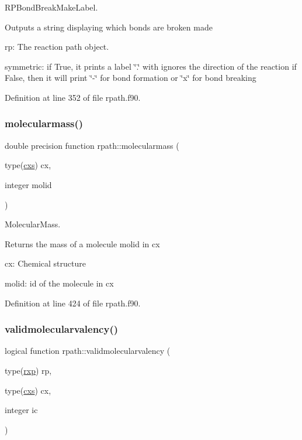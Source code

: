 R\+P\+Bond\+Break\+Make\+Label. 

Outputs a string displaying which bonds are broken made


\begin{DoxyItemize}
\item rp\+: The reaction path object.
\item symmetric\+: if True, it prints a label \char`\"{}.\char`\"{} with ignores the direction of the reaction if False, then it will print \char`\"{}-\/\char`\"{} for bond formation or \char`\"{}x\char`\"{} for bond breaking 
\end{DoxyItemize}

Definition at line 352 of file rpath.\+f90.

\mbox{\label{namespacerpath_a6790b5358cce92bedc4c75dab38d780d}} 
\subsubsection{\texorpdfstring{molecularmass()}{molecularmass()}}
{\footnotesize\ttfamily double precision function rpath\+::molecularmass (\begin{DoxyParamCaption}\item[{type(\mbox{\hyperlink{structchemstr_1_1cxs}{cxs}})}]{cx,  }\item[{integer}]{molid }\end{DoxyParamCaption})}



Molecular\+Mass. 

Returns the mass of a molecule molid in cx


\begin{DoxyItemize}
\item cx\+: Chemical structure
\item molid\+: id of the molecule in cx 
\end{DoxyItemize}

Definition at line 424 of file rpath.\+f90.

\mbox{\label{namespacerpath_ac1b5ae45f749a370ebab759dbaeeefd7}} 
\subsubsection{\texorpdfstring{validmolecularvalency()}{validmolecularvalency()}}
{\footnotesize\ttfamily logical function rpath\+::validmolecularvalency (\begin{DoxyParamCaption}\item[{type(\mbox{\hyperlink{structrpath_1_1rxp}{rxp}})}]{rp,  }\item[{type(\mbox{\hyperlink{structchemstr_1_1cxs}{cxs}})}]{cx,  }\item[{integer}]{ic }\end{DoxyParamCaption})}



